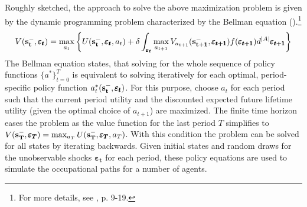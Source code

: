 Roughly sketched, the approach to solve the above maximization problem is given by the dynamic programming problem characterized by the Bellman equation (\cite{Bellman.1957}).\footnote{For more details, see \cite{Raabe.2019}, p. 9-19.}
\begin{align} \label{eq:Bellman}
V(\bold{s_t^-}, \pmb{\varepsilon_t}) = \max_{a_t} \bigg\{ U(\bold{s_t^-}, \pmb{\varepsilon_t}, a_t) + \delta \int_{\pmb{\varepsilon_t}} \max_{a_{t+1}} V_{a_{t+1}}(\bold{s_{t+1}^{-}},\pmb{\varepsilon_{t+1}}) f(\pmb{\varepsilon_{t+1}})d^{|A|}\pmb{\varepsilon_{t+1}}\bigg\}
\end{align}
\noindent
The Bellman equation states, that solving for the whole sequence of policy functions ${\{a^*\}_{t=0}^T}$ is equivalent to solving iteratively for each optimal, period-specific policy function $a_t^*(\bold{s_t^-}, \pmb{\varepsilon_t})$. For this purpose, choose $a_t$ for each period such that the current period utility and the discounted expected future lifetime utility (given the optimal choice of $a_{t+1}$) are maximized. The finite time horizon eases the problem as the value function for the last period $T$ simplifies to $V(\bold{s_T^-}, \pmb{\varepsilon_T}) = \max_{a_T} U(\bold{s_T^-}, \pmb{\varepsilon_T}, a_T)$. With this condition the problem can be solved for all states by iterating backwards. Given initial states and random draws for the  unobservable shocks $\pmb{\varepsilon_t}$ for each period, these policy equations are used to simulate the occupational paths for a number of agents.\\

